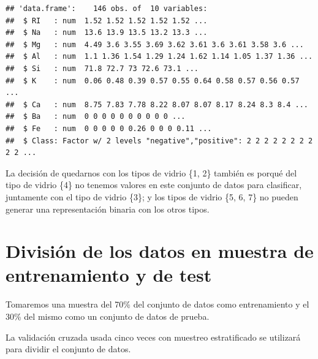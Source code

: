 \documentclass[]{article}
\newenvironment{Shaded}{\begin{snugshade}}{\end{snugshade}}
\newcommand{\DataTypeTok}[1]{\textcolor[rgb]{0.13,0.29,0.53}{#1}}
\newcommand{\DecValTok}[1]{\textcolor[rgb]{0.00,0.00,0.81}{#1}}
\newcommand{\FloatTok}[1]{\textcolor[rgb]{0.00,0.00,0.81}{#1}}
\newcommand{\KeywordTok}[1]{\textcolor[rgb]{0.13,0.29,0.53}{\textbf{#1}}}
\newcommand{\NormalTok}[1]{#1}
\newcommand{\OperatorTok}[1]{\textcolor[rgb]{0.81,0.36,0.00}{\textbf{#1}}}
\newcommand{\OtherTok}[1]{\textcolor[rgb]{0.56,0.35,0.01}{#1}}
\newcommand{\StringTok}[1]{\textcolor[rgb]{0.31,0.60,0.02}{#1}}
\begin{document}
\begin{verbatim}
## 'data.frame':    146 obs. of  10 variables:
##  $ RI   : num  1.52 1.52 1.52 1.52 1.52 ...
##  $ Na   : num  13.6 13.9 13.5 13.2 13.3 ...
##  $ Mg   : num  4.49 3.6 3.55 3.69 3.62 3.61 3.6 3.61 3.58 3.6 ...
##  $ Al   : num  1.1 1.36 1.54 1.29 1.24 1.62 1.14 1.05 1.37 1.36 ...
##  $ Si   : num  71.8 72.7 73 72.6 73.1 ...
##  $ K    : num  0.06 0.48 0.39 0.57 0.55 0.64 0.58 0.57 0.56 0.57 ...
##  $ Ca   : num  8.75 7.83 7.78 8.22 8.07 8.07 8.17 8.24 8.3 8.4 ...
##  $ Ba   : num  0 0 0 0 0 0 0 0 0 0 ...
##  $ Fe   : num  0 0 0 0 0 0.26 0 0 0 0.11 ...
##  $ Class: Factor w/ 2 levels "negative","positive": 2 2 2 2 2 2 2 2 2 2 ...
\end{verbatim}

La decisión de quedarnos con los tipos de vidrio \{1, 2\} también es porqué del tipo de vidrio \{4\} no tenemos valores en este conjunto de datos para clasificar, juntamente con el tipo de vidrio \{3\}; y los tipos de vidrio \{5, 6, 7\} no pueden generar una representación binaria con los otros tipos.

\hypertarget{divisiuxf3n-de-los-datos-en-muestra-de-entrenamiento-y-de-test}{%
\section{División de los datos en muestra de entrenamiento y de
test}\label{divisiuxf3n-de-los-datos-en-muestra-de-entrenamiento-y-de-test}}

Tomaremos una muestra del 70\% del conjunto de datos como entrenamiento y el 30\% del mismo como un conjunto de datos de prueba.

La validación cruzada usada cinco veces con muestreo estratificado se utilizará para dividir el conjunto de datos.

\begin{Shaded}
\end{Shaded}
\end{document}
